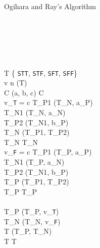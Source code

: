 
\begin{figure}[htbp]
	\renewcommand{\figurename}{Algorithm}
	\renewcommand{\thepseudocode}{\ref{ogiharaRayAlgorithm}}
	
	\begin{center}

	\begin{pseudocode}[shadowbox]{Ogihara and Ray's Algorithm}{\phi}
	
	\\
	\\
	\\
	\\
	\\
	T \GETS \{ \texttt{STT}, \texttt{STF}, \texttt{SFT},  \texttt{SFF}\} \\
	
	\FOR v   n \DO
		\BEGIN
		[T_P, T_N] \GETS {}(T)\\
	
		\FOREACH {} C  \phi \DO
			\BEGIN
				(a, b, c) \GETS C\\
				\IF v_{\texttt{T}} = c  \THEN
					\BEGIN
						T_{P1} \GETS {}(T_N, a_P)\\
						T_{N1} \GETS {}(T_N, a_N)\\				
						T_{P2} \GETS {}(T_{N1}, b_P)\\
						T_{N} \GETS {}(T_{P1}, T_{P2})\\
						T_{N} \GETS {}T_{N}\text{)}					
					\END \\  
				\IF v_{\texttt{F}} = c \THEN
					\BEGIN
						T_{P1} \GETS {}(T_P, a_P)\\
						T_{N1} \GETS {}(T_P, a_N)\\				
						T_{P2} \GETS {}(T_{N1}, b_P)\\
						T_{P} \GETS {}(T_{P1}, T_{P2})\\
						T_{P} \GETS {}T_{P}\text{)} 						
					\END\\
			\END\\
			T_P \GETS {}(T_P, v_{\texttt{T}})\\
			T_N \GETS {}(T_N, v_{\texttt{F}})\\
			T \GETS {}(T_P, T_N)\\
			T \GETS {}T\text{)} \\									
		\END\\
	\end{pseudocode}


\end{center}
\end{figure}
